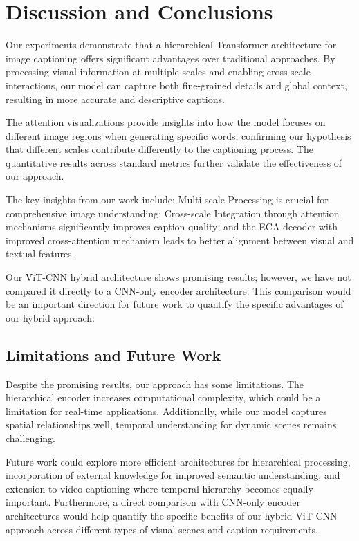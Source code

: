 \documentclass[10pt,twocolumn,letterpaper]{article}
\begin{document}
\section{Discussion and Conclusions}

Our experiments demonstrate that a hierarchical Transformer architecture for image captioning offers significant advantages over traditional approaches. By processing visual information at multiple scales and enabling cross-scale interactions, our model can capture both fine-grained details and global context, resulting in more accurate and descriptive captions.

The attention visualizations provide insights into how the model focuses on different image regions when generating specific words, confirming our hypothesis that different scales contribute differently to the captioning process. The quantitative results across standard metrics further validate the effectiveness of our approach.

The key insights from our work include: Multi-scale Processing is crucial for comprehensive image understanding; Cross-scale Integration through attention mechanisms significantly improves caption quality; and the ECA decoder with improved cross-attention mechanism leads to better alignment between visual and textual features.

Our ViT-CNN hybrid architecture shows promising results; however, we have not compared it directly to a CNN-only encoder architecture. This comparison would be an important direction for future work to quantify the specific advantages of our hybrid approach.

\subsection{Limitations and Future Work}

Despite the promising results, our approach has some limitations. The hierarchical encoder increases computational complexity, which could be a limitation for real-time applications. Additionally, while our model captures spatial relationships well, temporal understanding for dynamic scenes remains challenging.

Future work could explore more efficient architectures for hierarchical processing, incorporation of external knowledge for improved semantic understanding, and extension to video captioning where temporal hierarchy becomes equally important. Furthermore, a direct comparison with CNN-only encoder architectures would help quantify the specific benefits of our hybrid ViT-CNN approach across different types of visual scenes and caption requirements.
\end{document}
